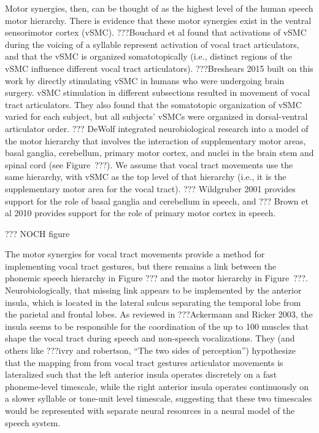 Motor synergies, then,
can be thought of as the highest level
of the human speech motor hierarchy.
There is evidence that these motor synergies
exist in the ventral sensorimotor cortex (vSMC).
???Bouchard et al found that activations
of vSMC during the voicing of a syllable
represent activation of vocal tract articulators,
and that the vSMC is organized somatotopically
(i.e., distinct regions of the vSMC
influence different vocal tract articulators).
???Breshears 2015 built on this work
by directly stimulating vSMC in humans
who were undergoing brain surgery.
vSMC stimulation in different subsections
resulted in movement of vocal tract articulators.
They also found that the somatotopic organization
of vSMC varied for each subject,
but all subjects' vSMCs were organized
in dorsal-ventral articulator order.
??? DeWolf integrated neurobiological research
into a model of the motor hierarchy
that involves the interaction of
supplementary motor areas,
basal ganglia, cerebellum,
primary motor cortex,
and nuclei in the brain stem and spinal cord
(see Figure~???).
We assume that vocal tract movements
use the same hierarchy,
with vSMC as the top level of that hierarchy
(i.e., it is the supplementary motor area
for the vocal tract).
??? Wildgruber 2001 provides support
for the role of basal ganglia
and cerebellum in speech,
and ??? Brown et al 2010
provides support for
the role of primary motor cortex
in speech.

??? NOCH figure

The motor synergies for vocal tract movements
provide a method for implementing
vocal tract gestures,
but there remains a link
between the phonemic
speech hierarchy in Figure ???
and the motor hierarchy
in Figure~???.
Neurobiologically,
that missing link appears to be
implemented by the anterior insula,
which is located in the lateral sulcus
separating the temporal lobe from
the parietal and frontal lobes.
As reviewed in ???Ackermann and Ricker 2003,
the insula seems to be responsible
for the coordination of the up to 100 muscles
that shape the vocal tract during speech
and non-speech vocalizations.
They (and others like ???ivry and robertson,
``The two sides of perception'')
hypothesize that the mapping from
from vocal tract gestures articulator movements
is lateralized such that
the left anterior insula operates
discretely on a fast phoneme-level timescale,
while the right anterior insula
operates continuously on a slower
syllable or tone-unit level timescale,
suggesting that these two timescales
would be represented
with separate neural resources
in a neural model of the speech system.

